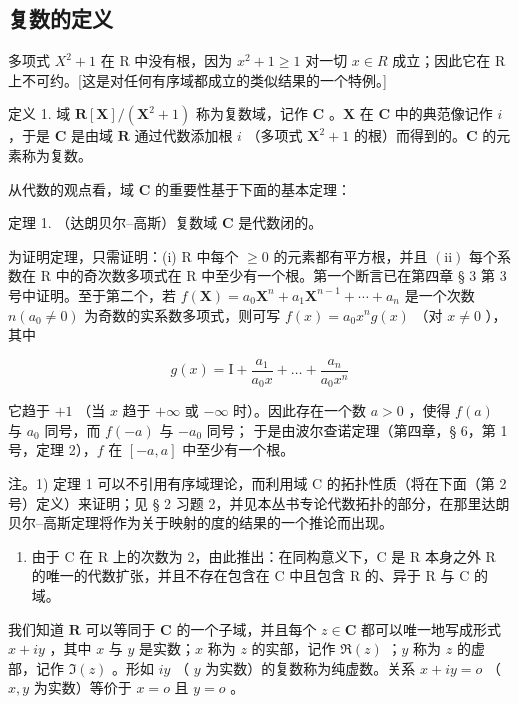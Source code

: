 \subsection{复数的定义}

多项式 \(X^{2} + 1\) 在 R 中没有根，因为 \(x^{2} + 1 \geqslant 1\) 对一切 \(x \in R\) 成立；因此它在 R 上不可约。{[}这是对任何有序域都成立的类似结果的一个特例。{]}

定义 1. 域 \(\mathbf{R}[\mathbf{X}] / (\mathbf{X}^2 + 1)\) 称为复数域，记作 \(\mathbf{C}\) 。\(\mathbf{X}\) 在 \(\mathbf{C}\) 中的典范像记作 \(i\) ，于是 \(\mathbf{C}\) 是由域 \(\mathbf{R}\) 通过代数添加根 \(i\) （多项式 \(\mathbf{X}^2 + 1\) 的根）而得到的。\(\mathbf{C}\) 的元素称为复数。

从代数的观点看，域 \(\mathbf{C}\) 的重要性基于下面的基本定理：

定理 1. （达朗贝尔–高斯）复数域 \(\mathbf{C}\) 是代数闭的。

为证明定理，只需证明：(i) R 中每个 \(\geqslant0\) 的元素都有平方根，并且 \((\mathrm{ii})\) 每个系数在 R 中的奇次数多项式在 R 中至少有一个根。第一个断言已在第四章 § 3 第 3 号中证明。至于第二个，若 \(f(\mathbf{X}) = a_{0}\mathbf{X}^{n} + a_{1}\mathbf{X}^{n-1} + \cdots + a_{n}\) 是一个次数 \(n(a_{0} \neq 0)\) 为奇数的实系数多项式，则可写 \(f(x) = a_{0}x^{n}g(x)\) （对 \(x \neq 0\) ），其中

\[
g (x) = \mathrm{I} + \frac {a _ {1}}{a _ {0} x} + \dots + \frac {a _ {n}}{a _ {0} x ^ {n}}
\]

它趋于 \(+1\) （当 \(x\) 趋于 \(+\infty\) 或 \(-\infty\) 时）。因此存在一个数 \(a > 0\) ，使得 \(f(a)\) 与 \(a_0\) 同号，而 \(f(-a)\) 与 \(-a_0\) 同号；
于是由波尔查诺定理（第四章，§ 6，第 1 号，定理 2），\(f\) 在 \([-a, a]\) 中至少有一个根。

注。1) 定理 1 可以不引用有序域理论，而利用域 C 的拓扑性质（将在下面（第 2 号）定义）来证明；见 § 2 习题 2，并见本丛书专论代数拓扑的部分，在那里达朗贝尔–高斯定理将作为关于映射的度的结果的一个推论而出现。

\begin{enumerate}
\def\labelenumi{\arabic{enumi})}
\setcounter{enumi}{1}
\tightlist
\item
  由于 C 在 R 上的次数为 2，由此推出：在同构意义下，C 是 R 本身之外 R 的唯一的代数扩张，并且不存在包含在 C 中且包含 R 的、异于 R 与 C 的域。
\end{enumerate}

我们知道 \(\mathbf{R}\) 可以等同于 \(\mathbf{C}\) 的一个子域，并且每个 \(z \in \mathbf{C}\) 都可以唯一地写成形式 \(x + iy\) ，其中 \(x\) 与 \(y\) 是实数；\(x\) 称为 \(z\) 的实部，记作 \(\Re(z)\) ；\(y\) 称为 \(z\) 的虚部，记作 \(\Im(z)\) 。形如 \(iy\) （ \(y\) 为实数）的复数称为纯虚数。关系 \(x + iy = o\) （ \(x, y\) 为实数）等价于 \(x = o\) 且 \(y = o\) 。


